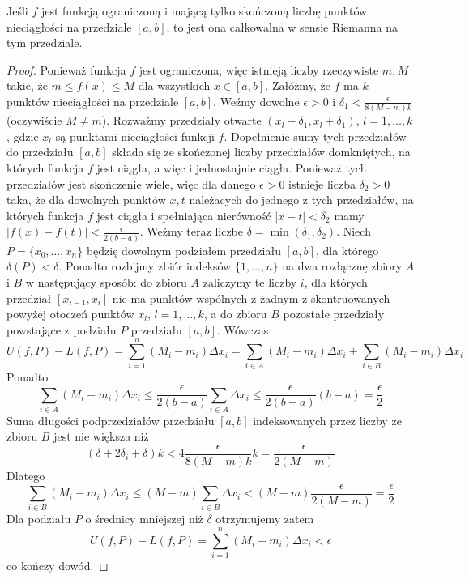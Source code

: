 \documentclass[leqno]{article}
\begin{document}
\begin{justify}
\begin{theorem}
    {Jeśli $f$ jest funkcją ograniczoną i mającą tylko skończoną liczbę punktów nieciągłości na przedziale $[a,b]$, to jest ona całkowalna w sensie Riemanna na tym przedziale.}
\end{theorem}

\begin{proof}
    Ponieważ funkcja $f$ jest ograniczona, więc istnieją liczby rzeczywiste $m, M$ takie, że $m \leq f(x) \leq M$
    dla wszystkich $x \in [a,b]$. Załóżmy, że $f$ ma $k$ punktów nieciągłości na przedziale $[a,b]$. 
    Weźmy dowolne $\epsilon > 0$ i $\delta_1 < \frac{\epsilon}{8(M-m)k}$ (oczywiście $M \neq m$).
    Rozważmy przedziały otwarte $(x_l - \delta_1, x_l + \delta_1)$, $l = 1, \ldots, k$, gdzie $x_l$ są punktami
    nieciągłości funkcji $f$. Dopełnienie sumy tych przedziałów do przedziału $[a,b]$ składa się ze skończonej
    liczby przedziałów domkniętych, na których funkcja $f$ jest ciągła, a więc i jednostajnie ciągła. Ponieważ tych przedziałów
    jest skończenie wiele, więc dla danego $\epsilon > 0$ istnieje liczba $\delta_2 > 0$ taka, że dla dowolnych
    punktów $x, t$ należacych do jednego z tych przedziałów, na których funkcja $f$ jest ciągła i spełniająca nierówność $|x-t| < \delta_2$ mamy
    $|f(x)-f(t)|<\frac{\epsilon}{2(b-a)}$. Weźmy teraz liczbe $\delta = \min{(\delta_1, \delta_2)}$.
    Niech $P = \{x_0,\ldots,x_n\}$ będzię dowolnym podziałem przedziału $[a,b]$, dla którego $\delta(P) < \delta$. Ponadto
    rozbijmy zbiór indeksów $\{1, \ldots, n\}$ na dwa rozłącznę zbiory $A$ i $B$ w następujący sposób: do zbioru $A$ zaliczymy te liczby $i$, 
    dla których przedział $[x_{i-1}, x_i]$ nie ma punktów wspólnych z żadnym z skontruowanych powyżej otoczeń punktów $x_l$, $l=1,\ldots,k$, a do zbioru $B$
    pozostałe przedziały powstające z podziału $P$ przedziału $[a,b]$. Wówczas
    \[
        U(f, P) - L(f, P) = \sum_{i=1}^{n}(M_i - m_i)\Delta x_i = \sum_{i \in A}(M_i - m_i)\Delta x_i + \sum_{i \in B}(M_i - m_i)\Delta x_i
    \]
    Ponadto
    \[
        \sum_{i \in A}(M_i - m_i)\Delta x_i \leq \frac{\epsilon}{2(b-a)}\sum_{i \in A}\Delta x_i \leq \frac{\epsilon}{2(b-a)}(b-a)=\frac{\epsilon}{2}
    \]
    Suma długości podprzedziałów przedziału $[a,b]$ indeksowanych przez liczby ze zbioru $B$ jest nie większa niż
    \[
        (\delta + 2\delta_i+\delta)k < 4 \frac{\epsilon}{8(M-m)k}k = \frac{\epsilon}{2(M-m)}
    \]
    Dlatego
    \[
        \sum_{i \in B}(M_i - m_i)\Delta x_i \leq (M-m)\sum_{i \in B}\Delta x_i < (M-m)\frac{\epsilon}{2(M-m)}=\frac{\epsilon}{2}
    \]
    Dla podziału $P$ o średnicy mniejszej niż $\delta$ otrzymujemy zatem
    \[
        U(f, P) - L(f, P) = \sum_{i=1}^{n}(M_i - m_i)\Delta x_i < \epsilon
    \]
    co kończy dowód.
\end{proof}


\end{justify}
\end{document}
